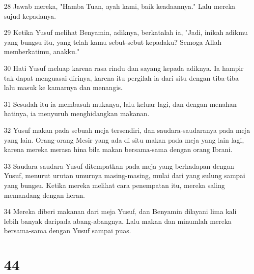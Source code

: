 \par 28 Jawab mereka, "Hamba Tuan, ayah kami, baik keadaannya." Lalu mereka sujud kepadanya.
\par 29 Ketika Yusuf melihat Benyamin, adiknya, berkatalah ia, "Jadi, inikah adikmu yang bungsu itu, yang telah kamu sebut-sebut kepadaku? Semoga Allah memberkatimu, anakku."
\par 30 Hati Yusuf meluap karena rasa rindu dan sayang kepada adiknya. Ia hampir tak dapat menguasai dirinya, karena itu pergilah ia dari situ dengan tiba-tiba lalu masuk ke kamarnya dan menangis.
\par 31 Sesudah itu ia membasuh mukanya, lalu keluar lagi, dan dengan menahan hatinya, ia menyuruh menghidangkan makanan.
\par 32 Yusuf makan pada sebuah meja tersendiri, dan saudara-saudaranya pada meja yang lain. Orang-orang Mesir yang ada di situ makan pada meja yang lain lagi, karena mereka merasa hina bila makan bersama-sama dengan orang Ibrani.
\par 33 Saudara-saudara Yusuf ditempatkan pada meja yang berhadapan dengan Yusuf, menurut urutan umurnya masing-masing, mulai dari yang sulung sampai yang bungsu. Ketika mereka melihat cara penempatan itu, mereka saling memandang dengan heran.
\par 34 Mereka diberi makanan dari meja Yusuf, dan Benyamin dilayani lima kali lebih banyak daripada abang-abangnya. Lalu makan dan minumlah mereka bersama-sama dengan Yusuf sampai puas.

\chapter{44}

